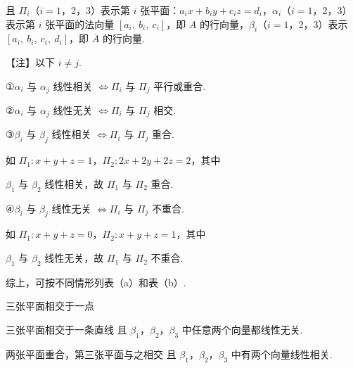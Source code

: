 且 $\Pi_i$（$i=1$，2，3）表示第 $i$ 张平面：$a_ix+b_iy+c_iz=d_i$，$\alpha_i$（$i=1$，2，3）表示第 $i$ 张平面的法向量 $[a_i,\ b_i,\ c_i]$，即 $A$ 的行向量，$\beta_i$（$i=1$，2，3）表示 $[a_i,\ b_i,\ c_i,\ d_i]$，即 $\overline{A}$ 的行向量.

\begin{fnote}
【注】以下 $i\ne j$.

①$\alpha_i$ 与 $\alpha_j$ 线性相关 $\Leftrightarrow \Pi_i$ 与 $\Pi_j$ 平行或重合.

②$\alpha_i$ 与 $\alpha_j$ 线性无关 $\Leftrightarrow \Pi_i$ 与 $\Pi_j$ 相交.

③$\beta_i$ 与 $\beta_j$ 线性相关 $\Leftrightarrow \Pi_i$ 与 $\Pi_j$ 重合.

如 $\Pi_1:x+y+z=1$，$\Pi_2:2x+2y+2z=2$，其中


$\beta_1$ 与 $\beta_2$ 线性相关，故 $\Pi_1$ 与 $\Pi_2$ 重合.

④$\beta_i$ 与 $\beta_j$ 线性无关 $\Leftrightarrow \Pi_i$ 与 $\Pi_j$ 不重合.

如 $\Pi_1:x+y+z=0$，$\Pi_2:x+y+z=1$，其中


$\beta_1$ 与 $\beta_2$ 线性无关，故 $\Pi_1$ 与 $\Pi_2$ 不重合.
\end{fnote}

综上，可按不同情形列表（a）和表（b）.



\begin{fcard}{三张平面相交于一点}
\end{fcard}

\begin{fcard}{三张平面相交于一条直线}
且 $\beta_1$，$\beta_2$，$\beta_3$ 中任意两个向量都线性无关.
\end{fcard}

\begin{fcard}{两张平面重合，第三张平面与之相交}
且 $\beta_1$，$\beta_2$，$\beta_3$ 中有两个向量线性相关.
\end{fcard}

